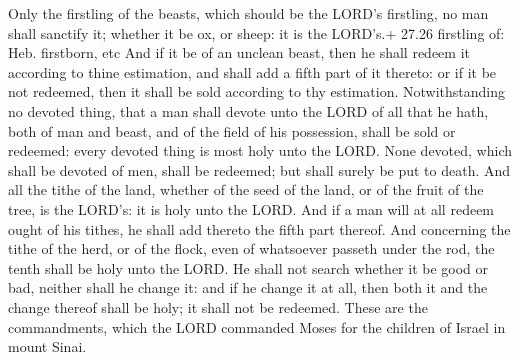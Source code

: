  Only the firstling of the beasts, which should be the
LORD's firstling, no man shall sanctify it; whether it be ox, or sheep:
it is the LORD's.+ 27.26 firstling of: Heb. firstborn, etc
 And if it be of an unclean beast, then he shall redeem
it according to thine estimation, and shall add a fifth part of it
thereto: or if it be not redeemed, then it shall be sold according to
thy estimation.  Notwithstanding no devoted thing, that a
man shall devote unto the LORD of all that he hath, both of man and
beast, and of the field of his possession, shall be sold or redeemed:
every devoted thing is most holy unto the LORD.  None
devoted, which shall be devoted of men, shall be redeemed; but shall
surely be put to death.  And all the tithe of the land,
whether of the seed of the land, or of the fruit of the tree, is the
LORD's: it is holy unto the LORD.  And if a man will at
all redeem ought of his tithes, he shall add thereto the fifth part
thereof.  And concerning the tithe of the herd, or of the
flock, even of whatsoever passeth under the rod, the tenth shall be holy
unto the LORD.  He shall not search whether it be good or
bad, neither shall he change it: and if he change it at all, then both
it and the change thereof shall be holy; it shall not be redeemed.
 These are the commandments, which the LORD commanded
Moses for the children of Israel in mount Sinai.

